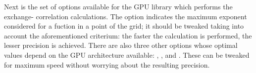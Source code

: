 Next is the set of options available for the GPU library which performs the exchange-
correlation calculations. The option  indicates
the maximum exponent considered for a fuction in a point of the grid; it should be 
tweaked taking into account the aforementioned criterium: the faster the calculation
is performed, the lesser precision is achieved. 
There are also three other options whose optimal values depend on the GPU architecture
available: , ,
and . These can be tweaked for maximum speed without
worrying about the resulting precision.


